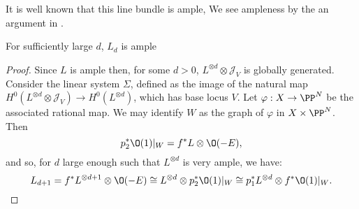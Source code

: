 It is well known that this line bundle is ample, We see ampleness by the an argument in \cite{}.
\begin{lemma}
For sufficiently large \(d\), \(L_d\) is ample
\end{lemma}
\begin{proof}
Since \(L\) is ample then, for some \(d>0\), \(L^{\otimes d} \otimes \mathcal{J}_V\) is globally generated. Consider the linear system \(\Sigma \), defined as the image of the natural map \(H^0(L^{\otimes d} \otimes \mathcal{J}_V) \to H^0(L^{\otimes d})\), which has base locus \(V\). Let \(\varphi: X \to \PP^N\) be the associated rational map. We may identify \(W\) as the graph of \(\varphi\) in \(X \times \PP^N\). Then
\[
p_2^* \O(1) |_W = f^*L \otimes \O(-E),
\]
and so, for \(d\) large enough such that \(L^{\otimes d}\) is very ample, we have:
\[
L_{d+1} = f^*L^{\otimes d+1} \otimes \O(-E) \cong L^{\otimes d} \otimes p_2^* \O(1) |_W \cong p_1^* L^{\otimes d} \otimes f^* \O(1) |_W.
\]
\end{proof}